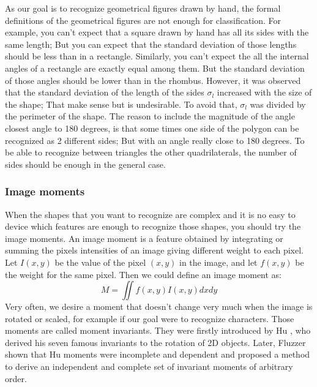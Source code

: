 \documentclass[10pt,journal]{IEEEtran}
\begin{document}
	As our goal is to recognize geometrical figures drawn by hand, the formal definitions
	of the geometrical figures are not enough for classification. For example, you can't expect that 
	a square drawn by hand has all its sides with the same length; But you can expect 
	that the standard deviation of those lengths should be less than in a rectangle.
	Similarly, you can't expect the all the internal angles of a rectangle are
	exactly equal among them. But the standard deviation of those angles should be
	lower than in the rhombus.\newline
	However, it was observed that the standard deviation of the length of the sides
	$\sigma_l$ increased with the size of the shape; That make sense but is
	undesirable. To avoid that, $\sigma_l$ was divided by the perimeter of the shape.
	The reason to include the magnitude of the angle closest angle to 180 degrees, is
	that some times one side of the polygon can be recognized as 2 different sides;
	But with an angle really close to 180 degrees.
	To be able to recognize between triangles the other quadrilaterals, the number of
	sides should be enough in the general case.
	
	\subsubsection{Image moments}
	When the shapes that you want to recognize are complex and it is no easy to device which
	features are enough to recognize those shapes, you should try the image moments. An image
	moment is a feature obtained by integrating or summing the pixels intensities of an image
	giving different weight to each pixel. Let $I(x,y)$ be the value of the pixel $(x,y)$ in
	the image, and let $f(x,y)$ be the weight for the same pixel. Then we could define an
	image moment as:
	\[ M = \iint f(x,y)I(x,y) dx dy \]
	Very often, we desire a moment that doesn't change very much when the image is rotated or
	scaled, for example if our goal were to recognize characters. Those moments are called 
	moment invariants. They were firstly introduced by Hu \cite{Hu}, who derived his seven
	famous invariants to the rotation of 2D objects. Later, Fluzzer \cite{fluzzer} shown that
	Hu moments were incomplete and dependent and proposed a method to derive an independent
	and complete set of invariant moments of arbitrary order.
	
\end{document}
